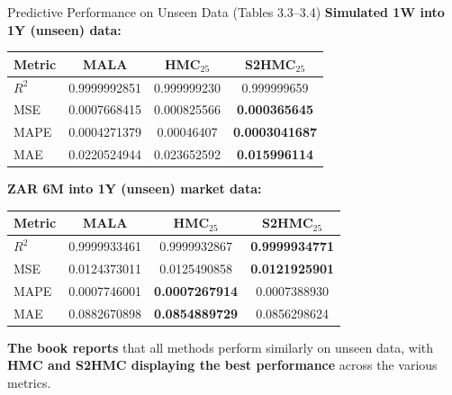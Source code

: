\documentclass[aspectratio=169,10pt]{beamer}
\begin{document}
\begin{frame}{Predictive Performance on Unseen Data (Tables 3.3--3.4)}
  \small
  \textbf{Simulated 1W into 1Y (unseen) data:}
  \begin{table}[]
    \centering
    \begin{tabular}{lccc}
      \toprule
      Metric & MALA & HMC$_{25}$ & S2HMC$_{25}$ \\
      \midrule
      $R^2$   & 0.9999992851 & 0.999999230 & 0.999999659 \\
      MSE     & 0.0007668415 & 0.000825566 & \textbf{0.000365645} \\
      MAPE    & 0.0004271379 & 0.00046407  & \textbf{0.0003041687} \\
      MAE     & 0.0220524944 & 0.023652592 & \textbf{0.015996114} \\
      \bottomrule
    \end{tabular}
  \end{table}
  \textbf{ZAR 6M into 1Y (unseen) market data:}
  \begin{table}[]
    \centering
    \begin{tabular}{lccc}
      \toprule
      Metric & MALA & HMC$_{25}$ & S2HMC$_{25}$ \\
      \midrule
      $R^2$   & 0.9999933461 & 0.9999932867 & \textbf{0.9999934771} \\
      MSE     & 0.0124373011 & 0.0125490858 & \textbf{0.0121925901} \\
      MAPE    & 0.0007746001 & \textbf{0.0007267914} & 0.0007388930 \\
      MAE     & 0.0882670898 & \textbf{0.0854889729} & 0.0856298624 \\
      \bottomrule
    \end{tabular}
  \end{table}
  \normalsize \textbf{The book reports} that all methods perform similarly on
  unseen data, with \textbf{HMC and S2HMC displaying the best performance}
  across the various metrics.
\end{frame}
\end{document}
